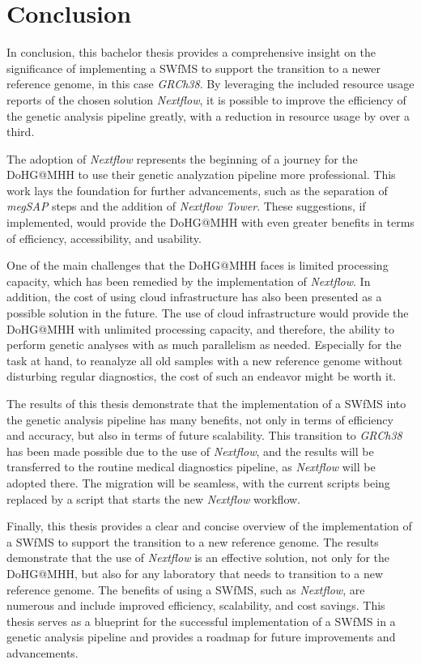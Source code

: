 \section{Conclusion}\label{sec:conclusion}

In conclusion, this bachelor thesis provides a comprehensive insight on the significance of implementing a \acl{SWfMS} to support the transition to a newer reference genome, in this case \textit{GRCh38}. By leveraging the included resource usage reports of the chosen solution \textit{Nextflow}, it is possible to improve the efficiency of the genetic analysis pipeline greatly, with a reduction in resource usage by over a third. 

The adoption of \textit{Nextflow} represents the beginning of a journey for the \ac{DoHG@MHH} to use their genetic analyzation pipeline more professional. This work lays the foundation for further advancements, such as the separation of \textit{\ac{megSAP}} steps and the addition of \textit{Nextflow Tower}. These suggestions, if implemented, would provide the \ac{DoHG@MHH} with even greater benefits in terms of efficiency, accessibility, and usability.

One of the main challenges that the \ac{DoHG@MHH} faces is limited processing capacity, which has been remedied by the implementation of \textit{Nextflow}. In addition, the cost of using cloud infrastructure has also been presented as a possible solution in the future. The use of cloud infrastructure would provide the \ac{DoHG@MHH} with unlimited processing capacity, and therefore, the ability to perform genetic analyses with as much parallelism as needed. Especially for the task at hand, to reanalyze all old samples with a new reference genome without disturbing regular diagnostics, the cost of such an endeavor might be worth it.

The results of this thesis demonstrate that the implementation of a \ac{SWfMS} into the genetic analysis pipeline has many benefits, not only in terms of efficiency and accuracy, but also in terms of future scalability. This transition to \textit{GRCh38} has been made possible due to the use of \textit{Nextflow}, and the results will be transferred to the routine medical diagnostics pipeline, as \textit{Nextflow} will be adopted there. The migration will be seamless, with the current scripts being replaced by a script that starts the new \textit{Nextflow} workflow.

Finally, this thesis provides a clear and concise overview of the implementation of a \ac{SWfMS} to support the transition to a new reference genome. The results demonstrate that the use of \textit{Nextflow} is an effective solution, not only for the \ac{DoHG@MHH}, but also for any laboratory that needs to transition to a new reference genome. The benefits of using a \ac{SWfMS}, such as \textit{Nextflow}, are numerous and include improved efficiency, scalability, and cost savings. This thesis serves as a blueprint for the successful implementation of a \ac{SWfMS} in a genetic analysis pipeline and provides a roadmap for future improvements and advancements.